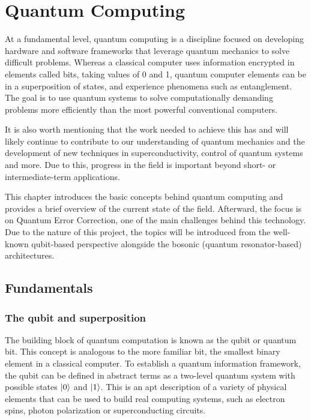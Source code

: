 
\chapter{Quantum Computing}
 
At a fundamental level, quantum computing is a discipline focused on developing hardware and software frameworks that leverage quantum mechanics to solve difficult problems. Whereas a classical computer uses information encrypted in elements called bits, taking values of 0 and 1, quantum computer elements can be in a superposition of states, and experience phenomena such as entanglement. The goal is to use quantum systems to solve computationally demanding problems more efficiently than the most powerful conventional computers. 

It is also worth mentioning that the work needed to achieve this has and will likely continue to contribute to our understanding of quantum mechanics and the development of new techniques in superconductivity, control of quantum systems and more. Due to this, progress in the field is important beyond short- or intermediate-term applications.

This chapter introduces the basic concepts behind quantum computing and provides a brief overview of the current state of the field. Afterward, the focus is on Quantum Error Correction, one of the main challenges behind this technology. Due to the nature of this project, the topics will be introduced from the well-known qubit-based perspective alongside the bosonic (quantum resonator-based) architectures.

\section{Fundamentals}
\subsection{The qubit and superposition}

The building block of quantum computation is known as the qubit or quantum bit. This concept is analogous to the more familiar bit, the smallest binary element in a classical computer. To establish a quantum information framework, the qubit can be defined in abstract terms as a two-level quantum system with possible states $\ket{0}$ and $\ket{1}$. This is an apt description of a variety of physical elements that can be used to build real computing systems, such as electron spins, photon polarization or superconducting circuits.

